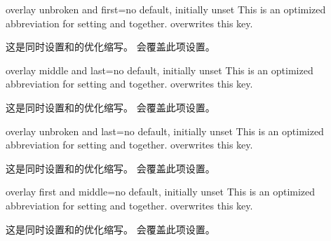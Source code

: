 \begin{docTcbKey}{overlay unbroken and first}{=}{no default, initially unset}
 This is an optimized abbreviation for setting
  and
  together.
  overwrites this key.

这是同时设置和的优化缩写。
会覆盖此项设置。
\end{docTcbKey}

\begin{docTcbKey}{overlay middle and last}{=}{no default, initially unset}
 This is an optimized abbreviation for setting
  and
  together.
  overwrites this key.

这是同时设置和的优化缩写。
会覆盖此项设置。
\end{docTcbKey}

\begin{docTcbKey}{overlay unbroken and last}{=}{no default, initially unset}
 This is an optimized abbreviation for setting
  and
  together.
  overwrites this key.

这是同时设置和的优化缩写。
会覆盖此项设置。
\end{docTcbKey}





\begin{docTcbKey}[][doc new=2014-09-19]{overlay first and middle}{=}{no default, initially unset}
 This is an optimized abbreviation for setting
  and  together.
  overwrites this key.

这是同时设置和的优化缩写。
会覆盖此项设置。
\end{docTcbKey}

